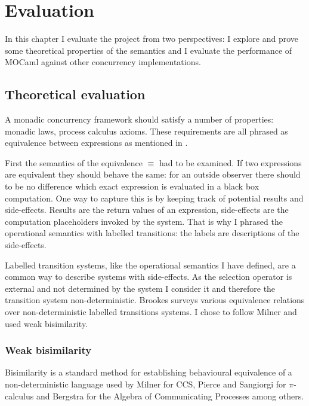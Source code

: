 \documentclass[12pt,twoside,notitlepage]{report}
\theoremstyle{plain}%
\theoremstyle{definition}
\theoremstyle{remark}
\begin{document}
\cleardoublepage
\chapter{Evaluation}
In this chapter I evaluate the project from two perspectives: I explore and prove some theoretical properties of the semantics and I evaluate the performance of MOCaml against other concurrency implementations.


\section{Theoretical evaluation}
\label{sec:behave_equiv}
A monadic concurrency framework should satisfy a number of properties: monadic laws, process calculus axioms. These requirements are all phrased as equivalence between expressions as mentioned in . 

First the semantics of the equivalence $ \equiv $ had to be examined. If two expressions are equivalent they should behave the same: for an outside observer there should to be no difference which exact expression is evaluated in a black box computation. One way to capture this is by keeping track of potential results and side-effects. Results are the return values of an expression, side-effects are the computation placeholders invoked by the system. That is why I phrased the operational semantics with labelled transitions: the labels are descriptions of the side-effects.

Labelled transition systems, like the operational semantics I have defined, are a common way to describe systems with side-effects. As the selection operator is external and not determined by the system I consider it and therefore the transition system non-deterministic. Brookes\cite{brookes1983behavioural} surveys various equivalence relations over non-deterministic labelled transitions systems. I chose to follow Milner\cite{milner1982calculus} and used weak bisimilarity.

\subsection{Weak bisimilarity}
Bisimilarity is a standard method for establishing behavioural equivalence of a non-deterministic language used by Milner for CCS\cite{milner1982calculus}, Pierce and Sangiorgi for $ \pi $-calculus\cite{pierce2000behavioral} and Bergstra for the Algebra of Communicating Processes\cite{bergstra1986algebra,bergstra1985algebra} among others. 
\end{document}
